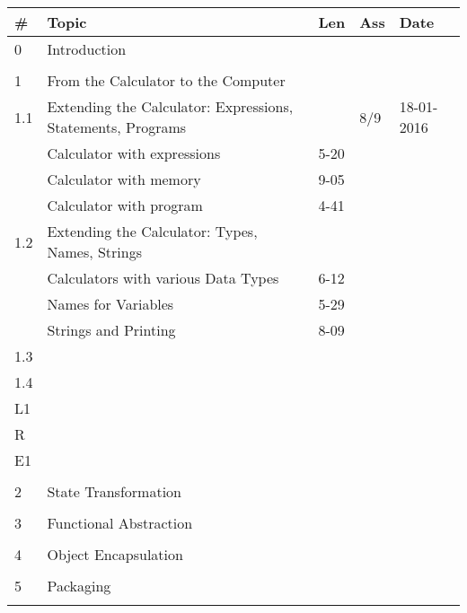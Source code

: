 \documentclass[a4paper,12pt]{article} %
\begin{document}
\begin{longtable}{|l|p{11cm}|l|l|l|}
	\hline
	\# & Topic & Len & Ass & Date \\
	\hline
	0 & \multicolumn{4}{|l|}{Introduction}\\
	\hline
	& & & &  \\
	\hline
	1 & \multicolumn{4}{|l|}{From the Calculator to the Computer}\\
	\hline
	1.1 & Extending the Calculator: Expressions, Statements, Programs & & 8/9 & 18-01-2016 \\
	\hline
	& Calculator with expressions & 5-20 & &  \\
	\hline
	& Calculator with memory & 9-05 & &  \\
	\hline
	& Calculator with program & 4-41 & &  \\
	\hline
	1.2 & Extending the Calculator: Types, Names, Strings& & &  \\
	\hline
	& Calculators with various Data Types & 6-12 & &  \\
	\hline
	& Names for Variables & 5-29 & &  \\
	\hline
	& Strings and Printing & 8-09 & &  \\
	\hline
	1.3 & & & &  \\
	\hline
	1.4 & & & &  \\
	\hline
	L1 & & & &  \\
	\hline
	R & & & &  \\
	\hline
	E1 & & & &  \\
	\hline
	& & & &  \\
	\hline
	2 & \multicolumn{4}{|l|}{State Transformation}\\
	\hline
	& & & &  \\
	\hline
	3 & \multicolumn{4}{|l|}{Functional Abstraction}\\
	\hline
	& & & &  \\
	\hline
	4 & \multicolumn{4}{|l|}{Object Encapsulation}\\
	\hline
	& & & &  \\
	\hline
	5 & \multicolumn{4}{|l|}{Packaging}\\
	\hline
	& & & &  \\
	\hline
\end{longtable}

\end{document}
